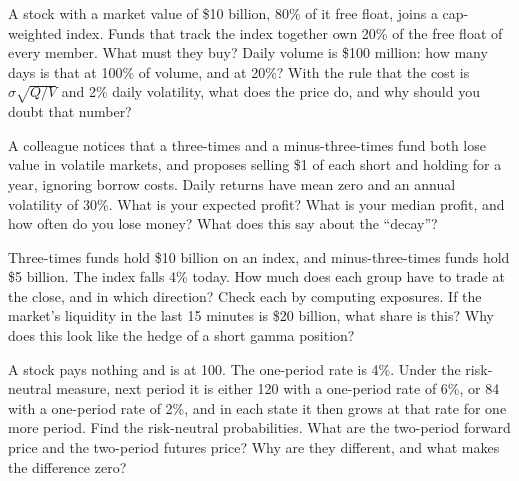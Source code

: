\begin{question}\label{iq:iv2:etfs-futures-and-index-arbitrage:25}
A stock with a market value of \$10 billion, 80\% of it free float, joins a cap-weighted index. Funds that track the index together own 20\% of the free float of every member. What must they buy? Daily volume is \$100 million: how many days is that at 100\% of volume, and at 20\%? With the rule that the cost is $\sigma\sqrt{Q/V}$ and 2\% daily volatility, what does the price do, and why should you doubt that number?
\end{question}

\begin{question}\label{iq:iv2:etfs-futures-and-index-arbitrage:26}
A colleague notices that a three-times and a minus-three-times fund both lose value in volatile markets, and proposes selling \$1 of each short and holding for a year, ignoring borrow costs. Daily returns have mean zero and an annual volatility of 30\%. What is your expected profit? What is your median profit, and how often do you lose money? What does this say about the ``decay''?
\end{question}

\begin{question}\label{iq:iv2:etfs-futures-and-index-arbitrage:27}
Three-times funds hold \$10 billion on an index, and minus-three-times funds hold \$5 billion. The index falls 4\% today. How much does each group have to trade at the close, and in which direction? Check each by computing exposures. If the market's liquidity in the last 15 minutes is \$20 billion, what share is this? Why does this look like the hedge of a short gamma position?
\end{question}

\begin{question}\label{iq:iv2:etfs-futures-and-index-arbitrage:28}
A stock pays nothing and is at 100. The one-period rate is 4\%. Under the risk-neutral measure, next period it is either 120 with a one-period rate of 6\%, or 84 with a one-period rate of 2\%, and in each state it then grows at that rate for one more period. Find the risk-neutral probabilities. What are the two-period forward price and the two-period futures price? Why are they different, and what makes the difference zero?
\end{question}

